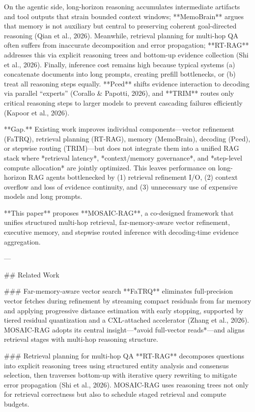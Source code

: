 On the agentic side, long-horizon reasoning accumulates intermediate artifacts and tool outputs that strain bounded context windows; **MemoBrain** argues that memory is not auxiliary but central to preserving coherent goal-directed reasoning (Qian et al., 2026). Meanwhile, retrieval planning for multi-hop QA often suffers from inaccurate decomposition and error propagation; **RT-RAG** addresses this via explicit reasoning trees and bottom-up evidence collection (Shi et al., 2026). Finally, inference cost remains high because typical systems (a) concatenate documents into long prompts, creating prefill bottlenecks, or (b) treat all reasoning steps equally. **Pced** shifts evidence interaction to decoding via parallel “experts” (Corallo & Papotti, 2026), and **TRIM** routes only critical reasoning steps to larger models to prevent cascading failures efficiently (Kapoor et al., 2026).

**Gap.** Existing work improves individual components—vector refinement (FaTRQ), retrieval planning (RT-RAG), memory (MemoBrain), decoding (Pced), or stepwise routing (TRIM)—but does not integrate them into a unified RAG stack where *retrieval latency*, *context/memory governance*, and *step-level compute allocation* are jointly optimized. This leaves performance on long-horizon RAG agents bottlenecked by (1) retrieval refinement I/O, (2) context overflow and loss of evidence continuity, and (3) unnecessary use of expensive models and long prompts.

**This paper** proposes **MOSAIC-RAG**, a co-designed framework that unifies structured multi-hop retrieval, far-memory-aware vector refinement, executive memory, and stepwise routed inference with decoding-time evidence aggregation.

---

## Related Work  

### Far-memory-aware vector search  
**FaTRQ** eliminates full-precision vector fetches during refinement by streaming compact residuals from far memory and applying progressive distance estimation with early stopping, supported by tiered residual quantization and a CXL-attached accelerator (Zhang et al., 2026). MOSAIC-RAG adopts its central insight—*avoid full-vector reads*—and aligns retrieval stages with multi-hop reasoning structure.

### Retrieval planning for multi-hop QA  
**RT-RAG** decomposes questions into explicit reasoning trees using structured entity analysis and consensus selection, then traverses bottom-up with iterative query rewriting to mitigate error propagation (Shi et al., 2026). MOSAIC-RAG uses reasoning trees not only for retrieval correctness but also to schedule staged retrieval and compute budgets.

